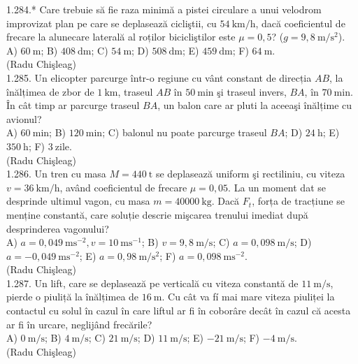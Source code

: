 1.284.* Care trebuie să fie raza minimă a pistei circulare a unui velodrom improvizat plan pe care se deplasează cicliştii, cu $54 \mathrm{~km} / \mathrm{h}$, dacă coeficientul de frecare la alunecare laterală al roților bicicliştilor este $\mu=0,5$? ($g=9,8 \mathrm{~m} / \mathrm{s}^{2}$).\\ A) $60 \mathrm{~m}$; B) $408 \mathrm{~dm}$; C) $54 \mathrm{~m}$; D) $508 \mathrm{~dm}$; E) $459 \mathrm{~dm}$; F) $64 \mathrm{~m}$.\\ (Radu Chişleag)\\

1.285. Un elicopter parcurge într-o regiune cu vânt constant de direcția $AB$, la înălțimea de zbor de $1 \mathrm{~km}$, traseul $AB$ în $50 \mathrm{~min}$ şi traseul invers, $BA$, în $70 \mathrm{~min}$. În cât timp ar parcurge traseul $BA$, un balon care ar pluti la aceeaşi înălțime cu avionul?\\ A) $60 \mathrm{~min}$; B) $120 \mathrm{~min}$; C) balonul nu poate parcurge traseul $BA$; D) $24 \mathrm{~h}$; E) $350 \mathrm{~h}$; F) $3 \mathrm{~zile}$.\\ (Radu Chişleag)\\

1.286. Un tren cu masa $M=440 \mathrm{~t}$ se deplasează uniform şi rectiliniu, cu viteza $v=36 \mathrm{~km} / \mathrm{h}$, având coeficientul de frecare $\mu=0,05$. La un moment dat se desprinde ultimul vagon, cu masa $m=40000 \mathrm{~kg}$. Dacă $F_{t}$, forța de tracțiune se menține constantă, care soluție descrie mişcarea trenului imediat după desprinderea vagonului?\\ A) $a=0,049 \mathrm{~ms}^{-2}, v=10 \mathrm{~ms}^{-1}$; B) $v=9,8 \mathrm{~m} / \mathrm{s}$; C) $a=0,098 \mathrm{~m} / \mathrm{s}$; D) $a=-0,049 \mathrm{~ms}^{-2}$; E) $a=0,98 \mathrm{~m} / \mathrm{s}^{2}$; F) $a=0,098 \mathrm{~ms}^{-2}$.\\ (Radu Chişleag)\\

1.287. Un lift, care se deplasează pe verticală cu viteza constantă de $11 \mathrm{~m} / \mathrm{s}$, pierde o piuliță la înălțimea de $16 \mathrm{~m}$. Cu cât va fí mai mare viteza piuliței la contactul cu solul în cazul în care liftul ar fi în coborâre decât în cazul că acesta ar fi în urcare, neglijând frecările?\\ A) $0 \mathrm{~m} / \mathrm{s}$; B) $4 \mathrm{~m} / \mathrm{s}$; C) $21 \mathrm{~m} / \mathrm{s}$; D) $11 \mathrm{~m} / \mathrm{s}$; E) $-21 \mathrm{~m} / \mathrm{s}$; F) $-4 \mathrm{~m} / \mathrm{s}$.\\ (Radu Chişleag)\\

